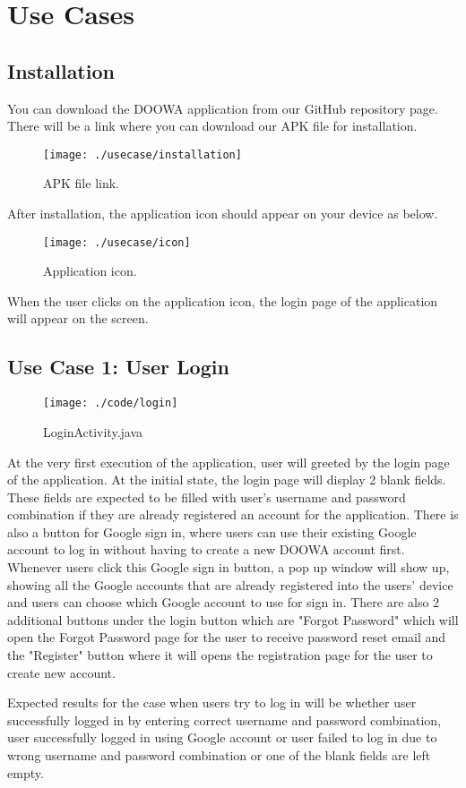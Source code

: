 \documentclass[conference]{IEEEtran}
\begin{document}
\section{Use Cases}
\subsection{Installation}

You can download the DOOWA application from our GitHub repository page. There will be a link where you can download our APK file for installation.

\begin{figure}[h!]
\texttt{[image: ./usecase/installation]}
\centering
\caption{APK file link.}
\end{figure}

After installation, the application icon should appear on your device as below.

\begin{figure}[h!]
\texttt{[image: ./usecase/icon]}
\centering
\caption{Application icon.}
\end{figure}

When the user clicks on the application icon, the login page of the application will appear on the screen.\break

\subsection{Use Case 1: User Login}

\begin{figure}[h!]
\texttt{[image: ./code/login]}
\centering
\caption{LoginActivity.java}
\end{figure}
At the very first execution of the application, user will greeted by the login page of the application. At the initial state, the login page will display 2 blank fields. These fields are expected to be filled with user's username and password combination if they are already registered an account for the application. There is also a button for Google sign in, where users can use their existing Google account to log in without having to create a new DOOWA account first. Whenever users click this Google sign in button, a pop up window will show up, showing all the Google accounts that are already registered into the users' device and users can choose which Google account to use for sign in. There are also 2 additional buttons under the login button which are "Forgot Password" which will open the Forgot Password page for the user to receive password reset email and the "Register" button where it will opens the registration page for the user to create new account.  \\ 
\par Expected results for the case when users try to log in will be whether user successfully logged in by entering correct username and password combination, user successfully logged in using Google account or user failed to log in due to wrong username and password combination or one of the blank fields are left empty. 
\end{document}
